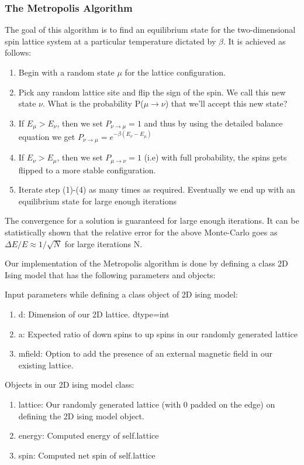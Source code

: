 \subsubsection{The Metropolis Algorithm}
The goal of this algorithm is to find an equilibrium state for the two-dimensional spin lattice system at a particular temperature dictated by \(\beta\). It is achieved as follows:
\begin{enumerate}
    \item Begin with a random state \(\mu\) for the lattice configuration.
    \item Pick any random lattice site and flip the sign of the spin. We call this new state \(\nu\). What is the probability P($\mu \rightarrow \nu$) that we'll accept this new state? 
    \item If \(E_{\mu}>E_{\nu}\), then we set $P_{\nu \rightarrow \mu} = 1$ and thus by using the detailed balance equation we get $P_{\nu \rightarrow \mu} =e^{-\beta(E_{\nu}-E_{\mu})}$
    \item If $E_{\nu}>E_{\mu}$, then we set $P_{\mu \rightarrow \nu} = 1$ (i.e) with full probability, the spins gets flipped to a more stable configuration.
    \item Iterate step (1)-(4) as many times as required. Eventually we end up with an equilibrium state for large enough iterations
\end{enumerate}

The convergence for a solution is guaranteed for large enough iterations. It can be statistically shown that the relative error for the above Monte-Carlo goes as $\Delta E/E \approx 1/\sqrt{N}$ for large iterations N.

Our implementation of the Metropolis algorithm is done by defining a class 2D Ising model that has the following parameters and objects:

Input parameters while defining a class object of 2D ising model:
\begin{enumerate}

    \item d: Dimension of our 2D lattice. dtype=int
    \item a: Expected ratio of down spins to up spins in our randomly generated lattice
    \item mfield: Option to add the presence of an external magnetic field in our existing lattice.
    
\end{enumerate}

Objects in our 2D ising model class:
\begin{enumerate}

    \item lattice: Our randomly generated lattice (with 0 padded on the edge) on defining the 2D ising model object.
    \item energy: Computed energy of self.lattice
    \item spin: Computed net spin of self.lattice
    
\end{enumerate}

